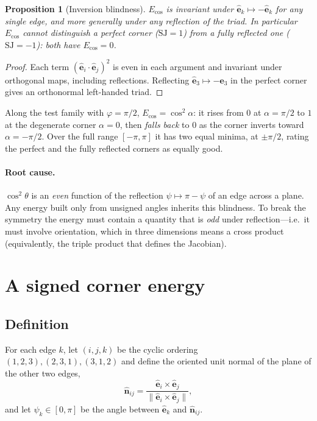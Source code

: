 \documentclass[11pt]{article}
\newtheorem{proposition}{Proposition}
\theoremstyle{definition}
\theoremstyle{remark}
\newcommand{\uv}[1]{\hat{\bm{#1}}}
\newcommand{\Eu}{E_{\cos}}
\newcommand{\SJ}{\mathrm{SJ}}
\begin{document}
\begin{proposition}[Inversion blindness]\label{prop:blind}
$\Eu$ is invariant under $\uv{e}_k\mapsto-\uv{e}_k$ for any single edge, and more generally under
any reflection of the triad. In particular $\Eu$ cannot distinguish a perfect corner
($\SJ=1$) from a fully reflected one ($\SJ=-1$): both have $\Eu=0$.
\end{proposition}
\begin{proof}
Each term $(\uv{e}_i\cdot\uv{e}_j)^2$ is even in each argument and invariant under orthogonal
maps, including reflections. Reflecting $\uv{e}_3\mapsto-\uv{e}_3$ in the perfect corner gives an
orthonormal left-handed triad.
\end{proof}

Along the test family with $\varphi=\pi/2$, $\Eu=\cos^2\alpha$: it rises from $0$ at $\alpha=\pi/2$
to $1$ at the degenerate corner $\alpha=0$, then \emph{falls back} to $0$ as the corner
inverts toward $\alpha=-\pi/2$. Over the full range $[-\pi,\pi]$ it has two equal minima, at
$\pm\pi/2$, rating the perfect and the fully reflected corners as equally good.

\paragraph{Root cause.} $\cos^2\theta$ is an \emph{even} function of the reflection
$\psi\mapsto\pi-\psi$ of an edge across a plane. Any energy built only from unsigned angles
inherits this blindness. To break the symmetry the energy must contain a quantity that is
\emph{odd} under reflection---i.e.\ it must involve orientation, which in three dimensions
means a cross product (equivalently, the triple product that defines the Jacobian).

\section{A signed corner energy}

\subsection{Definition}

For each edge $k$, let $(i,j,k)$ be the cyclic ordering $(1,2,3),(2,3,1),(3,1,2)$ and
define the oriented unit normal of the plane of the other two edges,
\begin{equation}
  \uv{n}_{ij}=\frac{\uv{e}_i\times\uv{e}_j}{\|\uv{e}_i\times\uv{e}_j\|},
\end{equation}
and let $\psi_k\in[0,\pi]$ be the angle between $\uv{e}_k$ and $\uv{n}_{ij}$.
\end{document}
